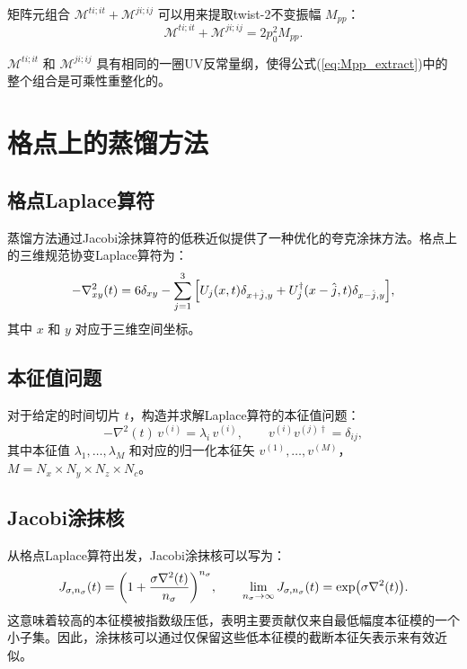 \documentclass[11pt,a4paper]{article}
\begin{document}
矩阵元组合 $\mathcal{M}^{ti;it} + \mathcal{M}^{ji;ij}$ 可以用来提取twist-2不变振幅 $M_{pp}$：
\begin{equation}\label{eq:Mpp_extract}
    \mathcal{M}^{ti;it} + \mathcal{M}^{ji;ij} = 2p_0^2 M_{pp}.
\end{equation}

$\mathcal{M}^{ti;it}$ 和 $\mathcal{M}^{ji;ij}$ 具有相同的一圈UV反常量纲，使得公式(\ref{eq:Mpp_extract})中的整个组合是可乘性重整化的。

\section{格点上的蒸馏方法}

\subsection{格点Laplace算符}

蒸馏方法\cite{Peardon:2009gh}通过Jacobi涂抹算符的低秩近似提供了一种优化的夸克涂抹方法。格点上的三维规范协变Laplace算符为：
\begin{equation}\label{eq:laplacian}
    -\nabla^2_{xy}(t) = 6\delta_{xy} - \sum_{j=1}^{3} \qty[U_j(x,t)\delta_{x+\hat{j},y} + U^\dagger_j(x-\hat{j},t)\delta_{x-\hat{j},y}],
\end{equation}
其中 $x$ 和 $y$ 对应于三维空间坐标。

\subsection{本征值问题}

对于给定的时间切片 $t$，构造并求解Laplace算符的本征值问题：
\begin{equation}\label{eq:eigenvalue}
    -\nabla^2(t) \, v^{(i)} = \lambda_i \, v^{(i)}, \qquad v^{(i)} v^{(j)\dagger} = \delta_{ij},
\end{equation}
其中本征值 $\lambda_1, \ldots, \lambda_M$ 和对应的归一化本征矢 $v^{(1)}, \ldots, v^{(M)}$，$M = N_x \times N_y \times N_z \times N_c$。

\subsection{Jacobi涂抹核}

从格点Laplace算符出发，Jacobi涂抹核可以写为：
\begin{equation}\label{eq:jacobi}
    J_{\sigma, n_\sigma}(t) = \qty(1 + \frac{\sigma \nabla^2(t)}{n_\sigma})^{n_\sigma}, \qquad \lim_{n_\sigma \to \infty} J_{\sigma, n_\sigma}(t) = \exp(\sigma \nabla^2(t)).
\end{equation}
这意味着较高的本征模被指数级压低，表明主要贡献仅来自最低幅度本征模的一个小子集。因此，涂抹核可以通过仅保留这些低本征模的截断本征矢表示来有效近似。
\end{document}
